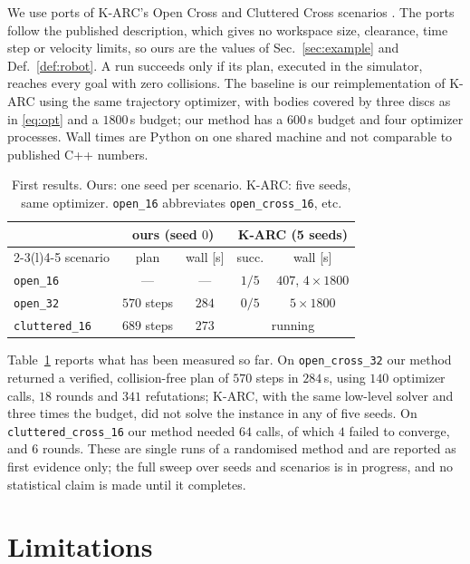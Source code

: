 \documentclass[conference]{IEEEtran}
\theoremstyle{plain}
\theoremstyle{definition}
\begin{document}
We use ports of K-ARC's Open Cross and Cluttered Cross scenarios \cite{karc2025}. The ports
follow the published description, which gives no workspace size, clearance, time step or
velocity limits, so ours are the values of Sec.~\ref{sec:example} and Def.~\ref{def:robot}. A
run succeeds only if its plan, executed in the simulator, reaches every goal with zero
collisions. The baseline is our reimplementation of K-ARC using the same trajectory optimizer,
with bodies covered by three discs as in \eqref{eq:opt} and a $1800$\,s budget; our method has a
$600$\,s budget and four optimizer processes. Wall times are Python on one shared machine and
not comparable to published C++ numbers.

\begin{table}[t]
\caption{First results. Ours: one seed per scenario. K-ARC: five seeds, same optimizer.
\texttt{open\_16} abbreviates \texttt{open\_cross\_16}, etc.}
\label{tab:results}
\centering
\small
\setlength{\tabcolsep}{3pt}
\begin{tabular}{lcccc}
\toprule
 & \multicolumn{2}{c}{ours (seed $0$)} & \multicolumn{2}{c}{K-ARC (5 seeds)} \\
\cmidrule(lr){2-3}\cmidrule(l){4-5}
scenario & plan & wall [s] & succ. & wall [s] \\
\midrule
\texttt{open\_16}      & ---                  & ---     & $1/5$ & $407$, $4{\times}1800$ \\
\texttt{open\_32}      & $570$ steps          & $284$   & $0/5$ & $5{\times}1800$ \\
\texttt{cluttered\_16} & $689$ steps          & $273$   & \multicolumn{2}{c}{running} \\
\bottomrule
\end{tabular}
\end{table}

Table~\ref{tab:results} reports what has been measured so far. On \texttt{open\_cross\_32} our
method returned a verified, collision-free plan of $570$ steps in $284$\,s, using $140$ optimizer
calls, $18$ rounds and $341$ refutations; K-ARC, with the same low-level solver and three times
the budget, did not solve the instance in any of five seeds. On \texttt{cluttered\_cross\_16}
our method needed $64$ calls, of which $4$ failed to converge, and $6$ rounds. These are single
runs of a randomised method and are reported as first evidence only; the full sweep over seeds
and scenarios is in progress, and no statistical claim is made until it completes.

\section{Limitations}
\label{sec:limits}
\end{document}
